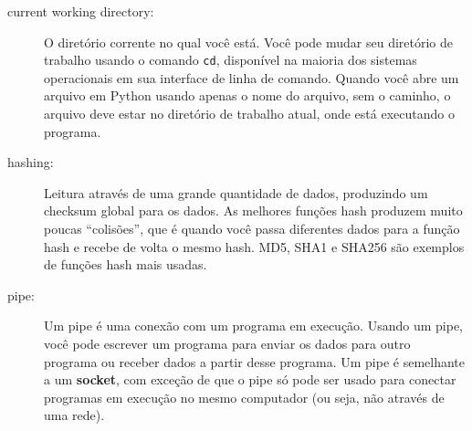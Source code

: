 \begin{description}
\item[current working directory:] O diretório corrente no qual você está. 
Você pode mudar seu diretório de trabalho usando o
comando {\tt cd}, disponível na maioria dos sistemas operacionais em sua interface de 
linha de comando.
Quando você abre um arquivo em Python usando apenas o nome do arquivo, sem o caminho, o arquivo 
deve estar no diretório de trabalho atual, onde está executando o programa.

\item[hashing:] Leitura através de uma grande quantidade de dados,
produzindo um checksum global para os dados. As melhores funções hash
produzem muito poucas ``colisões'', que é quando você passa diferentes 
dados para a função hash e recebe de volta o mesmo hash.
MD5, SHA1 e SHA256 são exemplos de funções hash mais usadas.

\item[pipe:] Um pipe é uma conexão com um programa em execução. Usando
um pipe, você pode escrever um programa para enviar os dados para outro programa
ou receber dados a partir desse programa. Um pipe é semelhante a um
{\bf socket}, com exceção de que o pipe só pode ser usado para
conectar programas em execução no mesmo computador (ou seja, não
através de uma rede).


\end{description}

